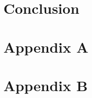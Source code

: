 \documentclass[12pt]{article}
\begin{document}
\section{Conclusion}

\newpage
\clearpage

\section{Appendix A}

\begin{figure}[H] 
\end{figure}

\newpage


\section{Appendix B}
\end{document}

